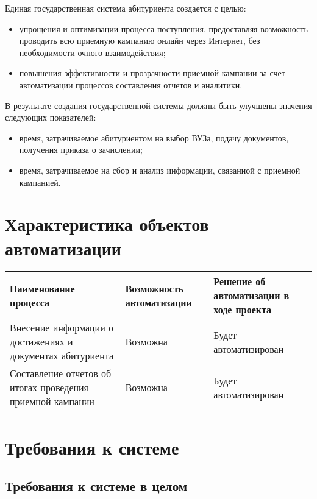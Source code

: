 \documentclass[a4paper, 14pt]{extarticle}
\begin{document}
Единая государственная система абитуриента создается с целью:
\begin{itemize}
  \item упрощения и оптимизации процесса поступления, предоставляя возможность
  проводить всю приемную кампанию онлайн через Интернет, без необходимости
  очного взаимодействия;
  \item повышения эффективности и прозрачности приемной кампании за счет
  автоматизации процессов составления отчетов и аналитики.
\end{itemize}

В результате создания государственной системы должны быть улучшены значения
следующих показателей:
\begin{itemize}
  \item время, затрачиваемое абитуриентом на выбор ВУЗа, подачу документов,
  получения приказа о зачислении;
  \item время, затрачиваемое на сбор и анализ информации, связанной с приемной
  кампанией.
\end{itemize}

\section{Характеристика объектов автоматизации}

\begin{longtable}{|L{0.3\textwidth}|L{0.3\textwidth}|L{0.3\textwidth}|}
  \hline
  \textbf{Наименование процесса}                             &
  \textbf{Возможность автоматизации}                         &
  \textbf{Решение об автоматизации в ходе проекта}             \\
  \hline
  Внесение информации о достижениях и документах абитуриента &
  Возможна                                                   &
  Будет автоматизирован                                        \\
  \hline
  Составление отчетов об итогах проведения приемной кампании &
  Возможна                                                   &
  Будет автоматизирован                                        \\
  \hline
\end{longtable}

\section{Требования к системе}

\subsection{Требования к системе в целом}
\end{document}
